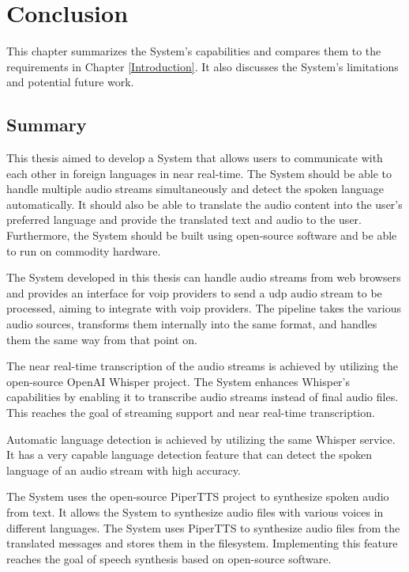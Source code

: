 \chapter{Conclusion}

\label{Conclusion}

This chapter summarizes the System's capabilities and compares them to the requirements in Chapter 
\ref{Introduction}. It also discusses the System's limitations and potential future work.


\section{Summary}

This thesis aimed to develop a System that allows users to communicate with each other in foreign languages in near 
real-time. The System should be able to handle multiple audio streams simultaneously and detect the spoken language 
automatically. It should also be able to translate the audio content into the user's preferred language and provide the 
translated text and audio to the user. Furthermore, the System should be built using open-source software and be able 
to run on commodity hardware.

The System developed in this thesis can handle audio streams from web browsers and provides an interface for \ac{voip} 
providers to send a \ac{udp} audio stream to be processed, aiming to integrate with \ac{voip} providers. The pipeline 
takes the various audio sources, transforms them internally into the same format, and handles them the same way from 
that point on.

The near real-time transcription of the audio streams is achieved by utilizing the open-source OpenAI Whisper project. 
The System enhances Whisper's capabilities by enabling it to transcribe audio streams instead of final audio files. 
This reaches the goal of streaming support and near real-time transcription.

Automatic language detection is achieved by utilizing the same Whisper service. It has a very capable language 
detection feature that can detect the spoken language of an audio stream with high accuracy.

The System uses the open-source PiperTTS project to synthesize spoken audio from text. It allows the System to 
synthesize audio files with various voices in different languages. The System uses PiperTTS to synthesize audio files 
from the translated messages and stores them in the filesystem. Implementing this feature reaches the goal of speech 
synthesis based on open-source software.

